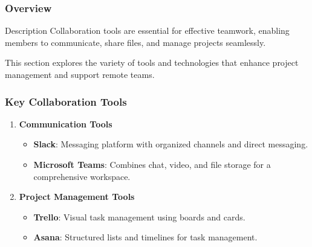 \documentclass[aspectratio=169]{beamer}
\begin{document}
\begin{frame}[fragile]
    \frametitle{Overview}
    \begin{block}{Description}
        Collaboration tools are essential for effective teamwork, enabling members to communicate, share files, and manage projects seamlessly. 
    \end{block}
    This section explores the variety of tools and technologies that enhance project management and support remote teams.
\end{frame}

\begin{frame}[fragile]
    \frametitle{Key Collaboration Tools}
    \begin{enumerate}
        \item \textbf{Communication Tools}
        \begin{itemize}
            \item \textbf{Slack}: Messaging platform with organized channels and direct messaging.
            \item \textbf{Microsoft Teams}: Combines chat, video, and file storage for a comprehensive workspace.
        \end{itemize}

        \item \textbf{Project Management Tools}
        \begin{itemize}
            \item \textbf{Trello}: Visual task management using boards and cards.
            \item \textbf{Asana}: Structured lists and timelines for task management.
        \end{itemize}
    \end{enumerate}
\end{frame}
\end{document}
